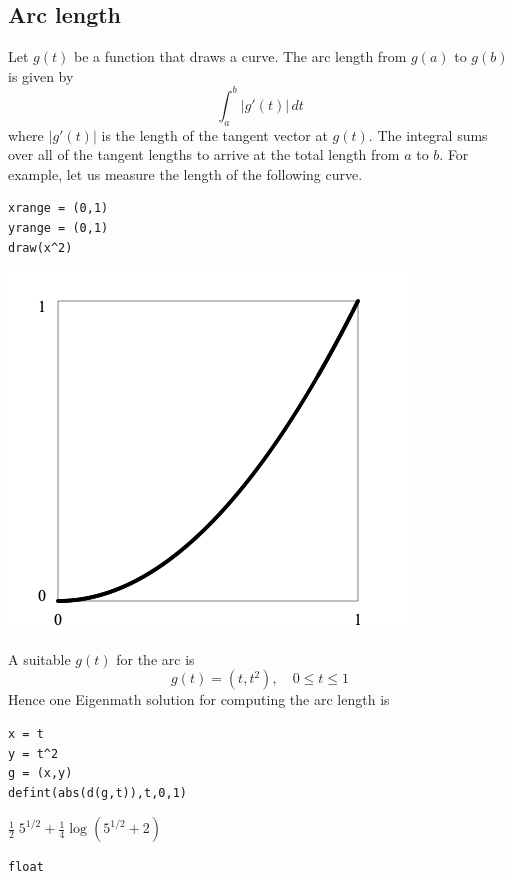 \subsection{Arc length}

Let $g(t)$ be a function that draws a curve.
The arc length from $g(a)$ to $g(b)$ is given by
$$\int_a^b|g'(t)|\,dt$$
where $|g'(t)|$ is the length of the tangent vector at $g(t)$.
The integral sums over all of the tangent lengths to arrive at the total length
from $a$ to $b$.
For example, let us measure the length of the following curve.

{\color{blue}
\begin{verbatim}
xrange = (0,1)
yrange = (0,1)
draw(x^2)
\end{verbatim}}

\begin{center}
\includegraphics[scale=0.5]{arc.png}
\end{center}

\noindent
A suitable $g(t)$ for the arc is
$$g(t)=(t,t^2),\quad0\le t\le1$$
Hence one Eigenmath solution for computing the arc length is

\begin{Verbatim}[formatcom=\color{blue},samepage=true]
x = t
y = t^2
g = (x,y)
defint(abs(d(g,t)),t,0,1)
\end{Verbatim}

\noindent
$\displaystyle \tfrac{1}{2}\;5^{1/2}+\tfrac{1}{4}\log(5^{1/2}+2)$

\begin{Verbatim}[formatcom=\color{blue},samepage=true]
float
\end{Verbatim}

